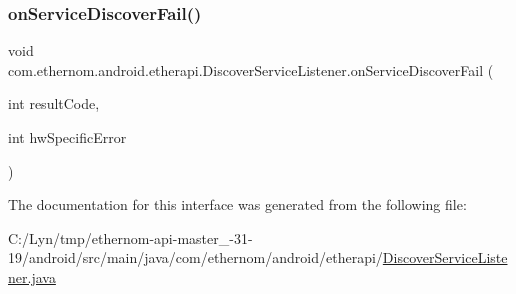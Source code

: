 \mbox{\label{interfacecom_1_1ethernom_1_1android_1_1etherapi_1_1_discover_service_listener_a0d7ab8a900298d299c863ce4b3527b8d}} 
\subsubsection{\texorpdfstring{on\+Service\+Discover\+Fail()}{onServiceDiscoverFail()}}
{\footnotesize\ttfamily void com.\+ethernom.\+android.\+etherapi.\+Discover\+Service\+Listener.\+on\+Service\+Discover\+Fail (\begin{DoxyParamCaption}\item[{int}]{result\+Code,  }\item[{int}]{hw\+Specific\+Error }\end{DoxyParamCaption})}



The documentation for this interface was generated from the following file\+:\begin{DoxyCompactItemize}
\item 
C\+:/\+Lyn/tmp/ethernom-\/api-\/master\+\_-\/31-\/19/android/src/main/java/com/ethernom/android/etherapi/\mbox{\hyperlink{_discover_service_listener_8java}{Discover\+Service\+Listener.\+java}}\end{DoxyCompactItemize}
